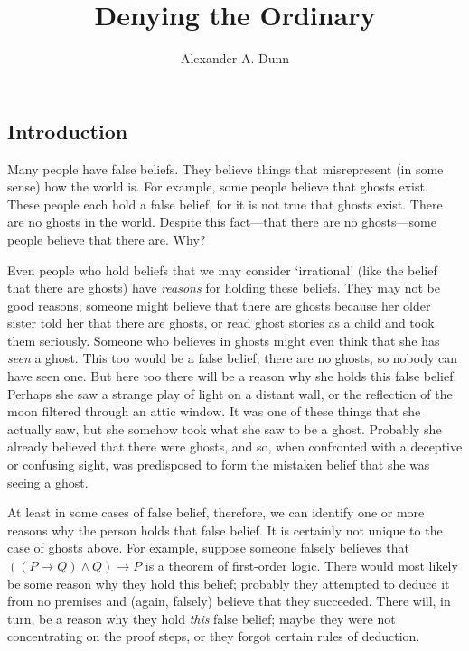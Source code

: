 \documentclass[11pt]{standalone}
\title{Denying the Ordinary}
\author{Alexander A. Dunn}
\newenvironment{inq}{\vspace{0pt}%
	\begin{list}{}%
	{\setlength\labelwidth{0pt}%
	\setlength\leftmargin{2.5\oddsidemargin}%
	\setlength\rightmargin{\leftmargin}}
	\begin{spacing}{1}
	\item[]%
	}{
	\end{spacing}
	\end{list}
	\vspace{10pt}
	}
\begin{document}
\ifstandalone
\maketitle
\tableofcontents
\begin{spacing}{1.5}
\fi


\section{Introduction}
\label{intro-deny}
\noindent Many people have false beliefs.  They believe things that
misrepresent (in some sense) how the world is.  For example, some
people believe that ghosts exist.  These people each hold a false
belief, for it is not true that ghosts exist.  There are no ghosts in
the world.  Despite this fact---that there are no ghosts---some people
believe that there are.  Why?

Even people who hold beliefs that we may consider `irrational' (like
the belief that there are ghosts) have {\em reasons} for holding these
beliefs.  They may not be good reasons; someone might believe that
there are ghosts because her older sister told her that there are
ghosts, or read ghost stories as a child and took them seriously.
Someone who believes in ghosts might even think that she has {\em
  seen} a ghost.  This too would be a false belief; there are no
ghosts, so nobody can have seen one.  But here too there will be a
reason why she holds this false belief.  Perhaps she saw a strange
play of light on a distant wall, or the reflection of the moon
filtered through an attic window.  It was one of these things that she
actually saw, but she somehow took what she saw to be a ghost.
Probably she already believed that there were ghosts, and so, when
confronted with a deceptive or confusing sight, was predisposed to
form the mistaken belief that she was seeing a ghost.

At least in some cases of false belief, therefore, we can identify one
or more reasons why the person holds that false belief.  It is
certainly not unique to the case of ghosts above.  For example,
suppose someone falsely believes that $((P \rightarrow Q ) \wedge Q)
\rightarrow P$ is a theorem of first-order logic.  There would most
likely be some reason why they hold this belief; probably they
attempted to deduce it from no premises and (again, falsely) believe
that they succeeded.  There will, in turn, be a reason why they hold
{\em this} false belief; maybe they were not concentrating on the
proof steps, or they forgot certain rules of deduction.


\end{spacing}
\end{document}
